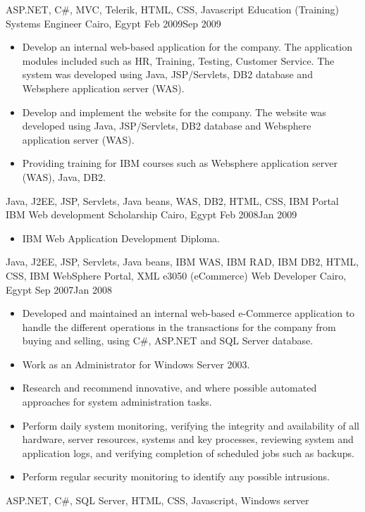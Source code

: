 \begin{experiences}
{\begin{itemize}
            \end{itemize}
        }
        {ASP.NET, {C\#}, MVC, Telerik, HTML, CSS, Javascript}
    \emptySeparator
    \experience
        {Education (Training)}   {Systems Engineer}
        {Cairo, Egypt}
        {Feb 2009}{Sep 2009}
        {
            \begin{itemize}
                \item Develop an internal web-based application for the company. The application modules included such as HR, Training, Testing, Customer
                Service. The system was developed using Java, JSP/Servlets, DB2
                database and Websphere application server (WAS).
                \item Develop and implement the website for the company. The website was developed using Java, JSP/Servlets, DB2 database and Websphere application server (WAS).
                \item Providing training for IBM courses such as Websphere application
                server (WAS), Java, DB2.
            \end{itemize}
        }
        {Java, J2EE, JSP, Servlets, Java beans, WAS, DB2, HTML, CSS, IBM Portal}
    \emptySeparator
    \experience
        {IBM}   {Web development Scholarship}
        {Cairo, Egypt}
        {Feb 2008}{Jan 2009}
        {
                    
            \begin{itemize}
                \item IBM Web Application Development Diploma.
            \end{itemize}
        }
        {Java, J2EE, JSP, Servlets, Java beans, IBM WAS, IBM RAD, IBM DB2, HTML, CSS, IBM WebSphere Portal, XML}
    \emptySeparator
    \experience
        {e3050 (eCommerce)}   {Web Developer}
        {Cairo, Egypt}
        {Sep 2007}{Jan 2008}
        {
            \begin{itemize}
                \item Developed and maintained an internal web-based e-Commerce 
                application to handle the different operations in the transactions for the company from buying and selling, using C\#, ASP.NET and SQL Server 
                database.
                \item Work as an Administrator for Windows Server 2003.
                \item Research and recommend innovative, and where possible automated approaches for system administration tasks.
                \item Perform daily system monitoring, verifying the integrity and availability of all hardware, server resources, systems and key processes, reviewing system and application logs, and verifying completion of 
                scheduled jobs such as backups.
                \item Perform regular security monitoring to identify any possible intrusions.
            \end{itemize}
        }
        {ASP.NET, {C\#}, SQL Server, HTML, CSS, Javascript, Windows server} 
\end{experiences}

